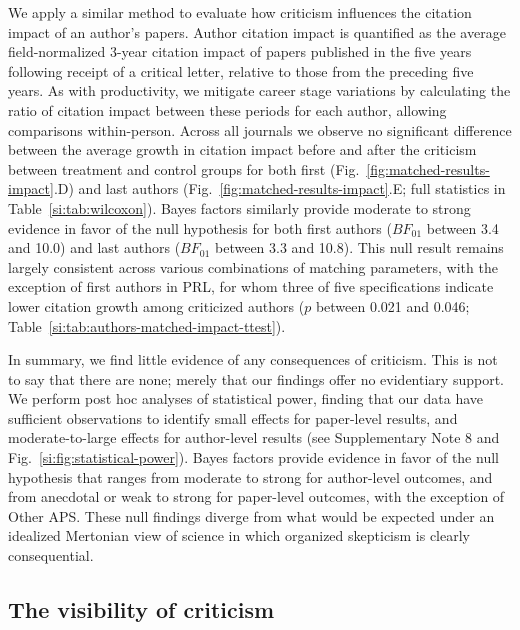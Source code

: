 \documentclass[12pt,a4paper]{article}
\numberwithin{equation}{section}
\begin{document}
We apply a similar method to evaluate how criticism influences the citation impact of an author's papers.
Author citation impact is quantified as the average field-normalized 3-year citation impact of papers published in the five years following receipt of a critical letter, relative to those from the preceding five years.
As with productivity, we mitigate career stage variations by calculating the ratio of citation impact between these periods for each author, allowing comparisons within-person.
Across all journals we observe no significant difference between the average growth in citation impact before and after the criticism between treatment and control groups for both first (Fig.~\ref*{fig:matched-results-impact}.D) and last authors (Fig.~\ref*{fig:matched-results-impact}.E; full statistics in Table~\ref*{si:tab:wilcoxon}).
Bayes factors similarly provide moderate to strong evidence in favor of the null hypothesis for both first authors ($BF_{01}$ between 3.4 and 10.0) and last authors ($BF_{01}$ between 3.3 and 10.8).
This null result remains largely consistent across various combinations of matching parameters, with the exception of first authors in PRL, for whom three of five specifications indicate lower citation growth among criticized authors ($p$ between 0.021 and 0.046; Table~\ref*{si:tab:authors-matched-impact-ttest}).

In summary, we find little evidence of any consequences of criticism. 
This is not to say that there are none; merely that our findings offer no evidentiary support.
We perform post hoc analyses of statistical power, finding that our data have sufficient observations to identify small effects for paper-level results, and moderate-to-large effects for author-level results (see Supplementary Note 8 and Fig.~\ref*{si:fig:statistical-power}).
Bayes factors provide evidence in favor of the null hypothesis that ranges from moderate to strong for author-level outcomes, and from anecdotal or weak to strong for paper-level outcomes, with the exception of Other APS.
These null findings diverge from what would be expected under an idealized Mertonian view of science in which organized skepticism is clearly consequential.

%
%
%
\subsection*{The visibility of criticism}
\end{document}
